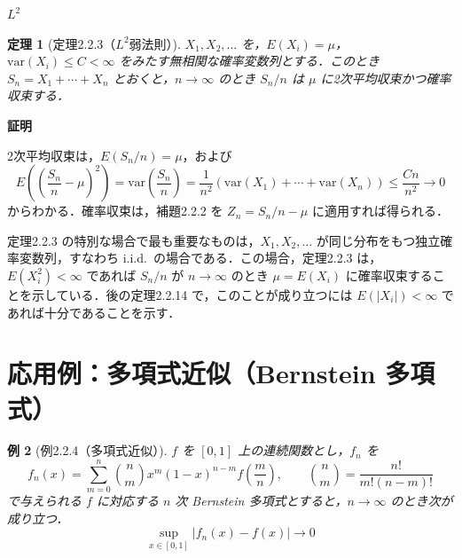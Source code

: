 \documentclass[dvipdfmx]{jsarticle}
\makeatletter
\numberwithin{equation}{section}
\theoremstyle{plain}
\newtheorem{thm}{定理}[section]
\newtheorem{ex}[thm]{例}
\renewenvironment{proof}[1][\proofname]{\par
  \pushQED{\qed}%
  \normalfont \topsep6\p@\@plus6\p@\relax
  \trivlist
  \item\relax
  {\bfseries
  #1\@addpunct{.}}\hspace\labelsep\ignorespaces
}{%
  \popQED\endtrivlist\@endpefalse
}
\renewcommand{\proofname}{証明}
\makeatother
\begin{document}
\texorpdfstring{$L^2$}{L2}
\begin{thm}[定理2.2.3（$L^2$弱法則）]
$X_1, X_2, \dots$ を，$E(X_i) = \mu$，$\mathrm{var}(X_i) \le C < \infty$ をみたす無相関な確率変数列とする．このとき $S_n = X_1 + \cdots + X_n$ とおくと，$n \to \infty$ のとき $S_n/n$ は $\mu$ に2次平均収束かつ確率収束する．
\end{thm}

\begin{proof}
2次平均収束は，$E(S_n/n) = \mu$，および
\[
  E\!\left(\left(\frac{S_n}{n} - \mu\right)^2\right)
  = \mathrm{var}\!\left(\frac{S_n}{n}\right)
  = \frac{1}{n^2}\left(\mathrm{var}(X_1) + \cdots + \mathrm{var}(X_n)\right)
  \le \frac{Cn}{n^2} \to 0
\]
からわかる．確率収束は，補題2.2.2 を $Z_n = S_n/n - \mu$ に適用すれば得られる．
\end{proof}

定理2.2.3 の特別な場合で最も重要なものは，$X_1, X_2, \dots$ が同じ分布をもつ独立確率変数列，すなわち i.i.d.\ の場合である．この場合，定理2.2.3 は，$E(X_i^2) < \infty$ であれば $S_n/n$ が $n \to \infty$ のとき $\mu = E(X_i)$ に確率収束することを示している．後の定理2.2.14 で，このことが成り立つには $E(|X_i|) < \infty$ であれば十分であることを示す．

\section{応用例：多項式近似（Bernstein 多項式）}

\begin{ex}[例2.2.4（多項式近似）]
$f$ を $[0,1]$ 上の連続関数とし，$f_n$ を
\[
  f_n(x) = \sum_{m=0}^n \binom{n}{m} x^m (1-x)^{n-m} f\!\left(\frac{m}{n}\right), \qquad
  \binom{n}{m} = \frac{n!}{m!(n-m)!}
\]
で与えられる $f$ に対応する $n$ 次 Bernstein 多項式とすると，$n \to \infty$ のとき次が成り立つ．
\[
  \sup_{x \in [0,1]} |f_n(x) - f(x)| \to 0
\]
\end{ex}
\end{document}

